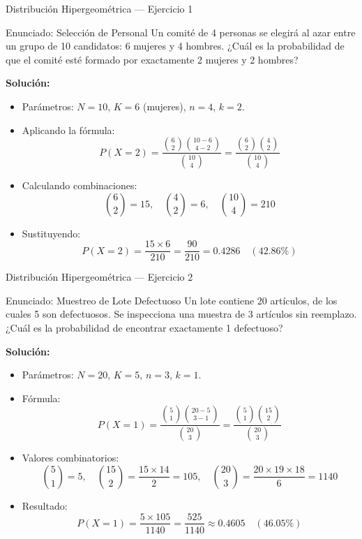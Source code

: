 \documentclass[aspectratio=169, 10pt]{beamer}
\begin{document}
\begin{frame}{Distribución Hipergeométrica — Ejercicio 1}
    \begin{exampleblock}{Enunciado: Selección de Personal}
        Un comité de 4 personas se elegirá al azar entre un grupo de 10 candidatos: 6 mujeres y 4 hombres. ¿Cuál es la probabilidad de que el comité esté formado por exactamente 2 mujeres y 2 hombres?
    \end{exampleblock}
        \pause
    \textbf{Solución:}
    \begin{itemize}
        \item Parámetros: $N = 10$, $K = 6$ (mujeres), $n = 4$, $k = 2$.
        \item Aplicando la fórmula:
        $$P(X = 2) = \frac{\binom{6}{2} \binom{10-6}{4-2}}{\binom{10}{4}} = \frac{\binom{6}{2} \binom{4}{2}}{\binom{10}{4}}$$
        \item Calculando combinaciones:
        $$\binom{6}{2} = 15, \quad \binom{4}{2} = 6, \quad \binom{10}{4} = 210$$
        \item Sustituyendo:
        $$P(X = 2) = \frac{15 \times 6}{210} = \frac{90}{210} = \mathbf{0.4286} \quad (42.86\%)$$
    \end{itemize}
\end{frame}

\begin{frame}{Distribución Hipergeométrica — Ejercicio 2}
    \begin{exampleblock}{Enunciado: Muestreo de Lote Defectuoso}
        Un lote contiene 20 artículos, de los cuales 5 son defectuosos. Se inspecciona una muestra de 3 artículos sin reemplazo. ¿Cuál es la probabilidad de encontrar exactamente 1 defectuoso?
    \end{exampleblock}
        \pause
    \textbf{Solución:}
    \begin{itemize}
        \item Parámetros: $N = 20$, $K = 5$, $n = 3$, $k = 1$.
        \item Fórmula:
        $$P(X = 1) = \frac{\binom{5}{1} \binom{20-5}{3-1}}{\binom{20}{3}} = \frac{\binom{5}{1} \binom{15}{2}}{\binom{20}{3}}$$
        \item Valores combinatorios:
        $$\binom{5}{1} = 5, \quad \binom{15}{2} = \frac{15 \times 14}{2} = 105, \quad \binom{20}{3} = \frac{20 \times 19 \times 18}{6} = 1140$$
        \item Resultado:
        $$P(X = 1) = \frac{5 \times 105}{1140} = \frac{525}{1140} \approx \mathbf{0.4605} \quad (46.05\%)$$
    \end{itemize}
\end{frame}
\end{document}
